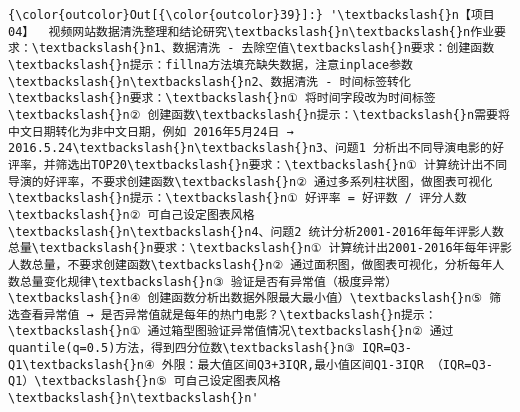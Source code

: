 \documentclass[11pt]{article}
\begin{document}
\begin{Verbatim}[commandchars=\\\{\}]
{\color{outcolor}Out[{\color{outcolor}39}]:} '\textbackslash{}n【项目04】  视频网站数据清洗整理和结论研究\textbackslash{}n\textbackslash{}n作业要求：\textbackslash{}n1、数据清洗 - 去除空值\textbackslash{}n要求：创建函数\textbackslash{}n提示：fillna方法填充缺失数据，注意inplace参数\textbackslash{}n\textbackslash{}n2、数据清洗 - 时间标签转化\textbackslash{}n要求：\textbackslash{}n① 将时间字段改为时间标签\textbackslash{}n② 创建函数\textbackslash{}n提示：\textbackslash{}n需要将中文日期转化为非中文日期，例如 2016年5月24日 → 2016.5.24\textbackslash{}n\textbackslash{}n3、问题1 分析出不同导演电影的好评率，并筛选出TOP20\textbackslash{}n要求：\textbackslash{}n① 计算统计出不同导演的好评率，不要求创建函数\textbackslash{}n② 通过多系列柱状图，做图表可视化\textbackslash{}n提示：\textbackslash{}n① 好评率 = 好评数 / 评分人数\textbackslash{}n② 可自己设定图表风格\textbackslash{}n\textbackslash{}n4、问题2 统计分析2001-2016年每年评影人数总量\textbackslash{}n要求：\textbackslash{}n① 计算统计出2001-2016年每年评影人数总量，不要求创建函数\textbackslash{}n② 通过面积图，做图表可视化，分析每年人数总量变化规律\textbackslash{}n③ 验证是否有异常值（极度异常）\textbackslash{}n④ 创建函数分析出数据外限最大最小值）\textbackslash{}n⑤ 筛选查看异常值 → 是否异常值就是每年的热门电影？\textbackslash{}n提示：\textbackslash{}n① 通过箱型图验证异常值情况\textbackslash{}n② 通过quantile(q=0.5)方法，得到四分位数\textbackslash{}n③ IQR=Q3-Q1\textbackslash{}n④ 外限：最大值区间Q3+3IQR,最小值区间Q1-3IQR （IQR=Q3-Q1）\textbackslash{}n⑤ 可自己设定图表风格\textbackslash{}n\textbackslash{}n'
\end{Verbatim}
            
\end{document}
